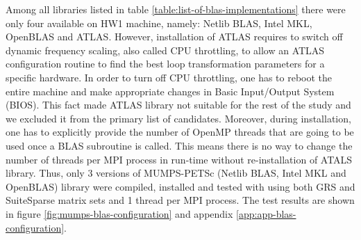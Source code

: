 Among all libraries listed in table \ref{table:list-of-blas-implementations} there were only four available on HW1 machine, namely: Netlib BLAS, Intel MKL, OpenBLAS and ATLAS. However, installation of ATLAS requires to switch off dynamic frequency scaling, also called CPU throttling, to allow an ATLAS configuration routine to find the best loop transformation parameters for a specific hardware. In order to turn off CPU throttling, one has to reboot the entire machine and make appropriate changes in Basic Input/Output System (BIOS). This fact made ATLAS library not suitable for the rest of the study and we excluded it from the primary list of candidates. Moreover, during installation, one has to explicitly provide the number of OpenMP threads that are going to be used once a BLAS subroutine is called. This means there is no way to change the number of threads per MPI process in run-time without re-installation of ATALS library. Thus, only 3 versions of MUMPS-PETSc (Netlib BLAS, Intel MKL and OpenBLAS) library were compiled, installed and tested with using both GRS and SuiteSparse matrix sets and 1 thread per MPI process. The test results are shown in figure \ref{fig:mumps-blas-configuration} and appendix \ref{app:app-blas-configuration}.\\



